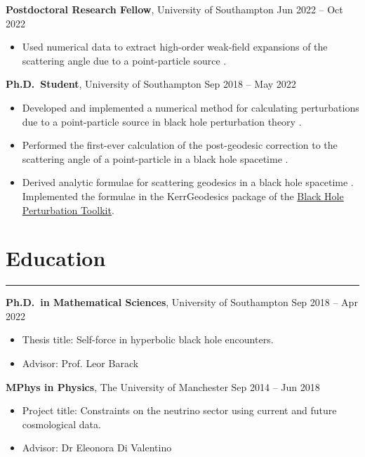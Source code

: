 \documentclass[10.5pt, oneside]{article}   	%
\begin{document}
\textbf{Postdoctoral Research Fellow}, University of Southampton \hfill Jun 2022 -- Oct 2022\\ 
\vspace{-5mm}
\begin{itemize}
\item Used numerical data to extract high-order weak-field expansions of the scattering angle due to a point-particle source \cite{Barack:2023oqp}.
\end{itemize}

\textbf{Ph.D.\ Student}, University of Southampton \hfill Sep 2018 -- May 2022\\ 
\vspace{-5mm}
\begin{itemize}
\item Developed and implemented a numerical method for calculating perturbations due to a point-particle source in black hole perturbation theory \cite{Barack:2022pde,Long:2021ufh}.
\item Performed the first-ever calculation of the post-geodesic correction to the scattering angle of a point-particle in a black hole spacetime \cite{Barack:2022pde}.
\item Derived analytic formulae for scattering geodesics in a black hole spacetime \cite{Long:2021ufh}. Implemented the formulae in the KerrGeodesics package of the \href{https://bhptoolkit.org/}{Black Hole Perturbation Toolkit}.
\end{itemize}


{\color{Sectioncolour}
\section*{Education}
\vspace{-3mm}
\noindent\rule{\linewidth}{0.6pt}}

\textbf{Ph.D.\ in Mathematical Sciences}, University of Southampton \hfill Sep 2018 -- Apr 2022 \\
\vspace{-5mm} 
\begin{itemize}
\item Thesis title: Self-force in hyperbolic black hole encounters.
\item Advisor: Prof. Leor Barack
\end{itemize}
\textbf{MPhys in Physics}, The University of Manchester \hfill Sep 2014 -- Jun 2018 \\ 
\vspace{-5mm}
\begin{itemize}
\item Project title: Constraints on the neutrino sector using current and future cosmological data.
\item Advisor: Dr Eleonora Di Valentino
\end{itemize}
\end{document}
